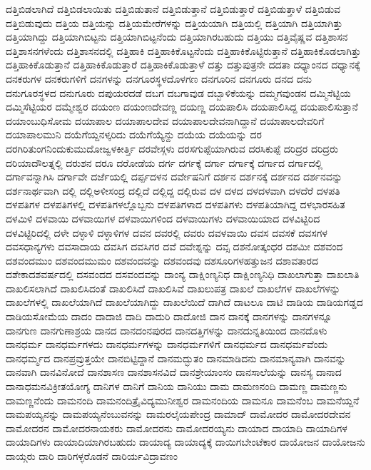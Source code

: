 {ದತ್ತಿಬಿಡಲಾಗಿದೆ
ದತ್ತಿಬಿಡಲಾಯಿತು
ದತ್ತಿಬಿಡುತಾನೆ
ದತ್ತಿಬಿಡುತ್ತಾನೆ
ದತ್ತಿಬಿಡುತ್ತಾರೆ
ದತ್ತಿಬಿಡುತ್ತಾಳೆ
ದತ್ತಿಬಿಡುವ
ದತ್ತಿಬಿಡುವುದು
ದತ್ತಿಯ
ದತ್ತಿಯನ್ನು
ದತ್ತಿಯಮೇರೆಗಳನ್ನು
ದತ್ತಿಯಯಾಗಿ
ದತ್ತಿಯಲ್ಲಿ
ದತ್ತಿಯಾಗಿ
ದತ್ತಿಯಾಗಿತ್ತು
ದತ್ತಿಯಾಗಿದ್ದು
ದತ್ತಿಯಾಗಿಬಿಟ್ಟನು
ದತ್ತಿಯಾಗಿಬಿಟ್ಟನೆಂದು
ದತ್ತಿಯಾಗಿರಬಹುದು
ದತ್ತಿಯು
ದತ್ತಿವೈಷ್ಣವ
ದತ್ತಿಶಾಸನ
ದತ್ತಿಶಾಸನಗಳೆಂದು
ದತ್ತಿಶಾಸನದಲ್ಲಿ
ದತ್ತಿಹಾಕಿ
ದತ್ತಿಹಾಕಿಕೊಟ್ಟನೆಂದು
ದತ್ತಿಹಾಕಿಕೊಟ್ಟಿರುತ್ತಾನೆ
ದತ್ತಿಹಾಕಿಕೊಡಲಾಗಿತ್ತು
ದತ್ತಿಹಾಕಿಕೊಡುತ್ತಾನೆ
ದತ್ತಿಹಾಕಿಕೊಡುತ್ತಾರೆ
ದತ್ತಿಹಾಕಿಕೊಡುತ್ತಾಳೆ
ದತ್ತು
ದತ್ತುಪುತ್ರನೇ
ದದತಾ
ದಧ್ಯಾಂನದ
ದಧ್ಯಾನಕ್ಕೆ
ದನಕರುಗಳ
ದನಕರುಗಳಿಗೆ
ದನಗಳನ್ನು
ದನಗೂರಸ್ಥಳದೊಳಗಣ
ದನಗೂರಿನ
ದನಗೂರು
ದನದ
ದನು
ದನುಗೂರಸ್ಥಳದ
ದನುಗೂರು
ದಪುಯರದಡೆ
ದಬಗ
ದಬಗಾವುಡ
ದಬ್ಬಾಳಿಕೆಯನ್ನು
ದಮ್ಮಗವುಂಡನ
ದಮ್ಮಿಸೆಟ್ಟಿಯ
ದಮ್ಮಿಸೆಟ್ಟಿಯರ
ದಮ್ಮೇಶ್ವರ
ದಯಂಣ
ದಯಂಣದೇವಣ್ಣ
ದಯಣ್ಣ
ದಯಪಾಲಿಸಿ
ದಯಪಾಲಿಸಿದ್ದ
ದಯಪಾಲಿಸುತ್ತಾನೆ
ದಯಾಂಬುಧಿಸೋಮ
ದಯಾಪಾಲ
ದಯಾಪಾಲದೇವ
ದಯಾಪಾಲದೇವನಾಗಿದ್ದಾನೆ
ದಯಾಪಾಲದೇವರಿಗೆ
ದಯಾಪಾಲಮುನಿ
ದಯೆಗೆಯ್ದನಳ್ಕರಿದು
ದಯೆಗೆಯ್ಯೆನ್ದು
ದಯೆಯ
ದಯೆಯನ್ನು
ದರ
ದರಗಿರಿತುಂಗನಿಂದುಕುಮುದೋಜ್ವಳಕೀರ್ತ್ತಿ
ದರವೇಸ್ಗಳು
ದರಸಗುಪ್ಪೆಯಾಗಿರುವ
ದರಸಿಕುಪ್ಪೆ
ದರಿದ್ರರ
ದರಿದ್ರರು
ದರಿಯಾದೌಲತ್ನಲ್ಲಿ
ದರುಶನ
ದರೂ
ದರೋಡೆಯ
ದರ್ಗ
ದರ್ಗಕ್ಕೆ
ದರ್ಗಾ
ದರ್ಗಾಕ್ಕೆ
ದರ್ಗಾದ
ದರ್ಗಾದಲ್ಲಿ
ದರ್ಗಾವನ್ನಾಗಿಸಿ
ದರ್ಗಾವೇ
ದರ್ಜೆಯಲ್ಲಿ
ದರ್ಪ್ಪದಳನ
ದರ್ವೇಷನಿಗೆ
ದರ್ಶನ
ದರ್ಶನಕ್ಕೆ
ದರ್ಶನದ
ದರ್ಶನವನ್ನು
ದರ್ಶನಾರ್ಥವಾಗಿ
ದಲ್ಲಿ
ದಲ್ಲಿಅಳೀಸಂದ್ರ
ದಲ್ಲಿದೆ
ದಲ್ಲಿದ್ದ
ದಲ್ಲಿರುವ
ದಳ
ದಳದ
ದಳದಳವಾಗಿ
ದಳದೆರೆ
ದಳಪತಿ
ದಳಪತಿಗಳ
ದಳಪತಿಗಳಲ್ಲಿ
ದಳಪತಿಗಳಲ್ಲೊಬ್ಬನು
ದಳಪತಿಗಳಾದ
ದಳಪತಿಗಳು
ದಳಪತಿಯಾಗಿದ್ದ
ದಳಭಾರಸಹಿತ
ದಳಮಿಳಿ
ದಳವಾಯಿ
ದಳವಾಯಿಗಳ
ದಳವಾಯಿಗಳಿಂದ
ದಳವಾಯಿಗಳು
ದಳವಾಯಿಯಾದ
ದಳವಿಟ್ಟಿರಿದ
ದಳವಿಟ್ಟಿರಿದಲ್ಲಿ
ದಳೇ
ದಳ್ಳಾಳಿ
ದಳ್ಳಾಳಿಗಳ
ದವನ
ದವರಲ್ಲಿ
ದವರು
ದವಳವಾಯಿ
ದವಸ
ದವಸಕೆ
ದವಸಗಳ
ದವಸಧಾನ್ಯಗಳು
ದವಸಾದಾಯ
ದವಸಿಗ
ದವಸಿಗರ
ದವೆ
ದವೇಶ್ನನ್ನು
ದವ್ಸ
ದಶನೋತ್ಕಂಧರ
ದಶಮೀ
ದಶವಂದ
ದಶವಂದಮುಂ
ದಶವಂದಮುಮಂ
ದಶವಂದವನ್ನು
ದಶವಂದವು
ದಶಸೂರಿಗಳಹತ್ತುಜನ
ದಶಾವತಾರದ
ದಶೇಕಾದಶವರ್ಷದಲ್ಲಿ
ದಸವಂದದ
ದಸವಂದವನ್ನು
ದಾಂನ್ಯ
ದಾಕ್ಷಿಂಣ್ಯನಿಧ
ದಾಕ್ಷಿಂಣ್ಯನಿಧಿ
ದಾಖಲಾಗುತ್ತಾ
ದಾಖಲಾತಿ
ದಾಖಲಿಸಲಾಗಿದೆ
ದಾಖಲಿಸಿದಂತೆ
ದಾಖಲಿಸಿದೆ
ದಾಖಲಿಸಿವೆ
ದಾಖಲುಪತ್ರ
ದಾಖಲೆ
ದಾಖಲೆಗಳ
ದಾಖಲೆಗಳನ್ನು
ದಾಖಲೆಗಳಲ್ಲಿ
ದಾಖಲೆಯಾಗಿದೆ
ದಾಖಲೆಯಾಗಿದ್ದು
ದಾಖಲೆಯಿದೆ
ದಾಗಿದೆ
ದಾಟಲೂ
ದಾಟಿ
ದಾಡಿಯ
ದಾಡಿಯಗಡ್ಡದ
ದಾಡಿಯಸೋಮೆಯ
ದಾದಂ
ದಾದಾಜಿ
ದಾದಿ
ದಾದುರಿ
ದಾದೋಜಿ
ದಾನ
ದಾನಕ್ಕೆ
ದಾನಗಳನ್ನು
ದಾನಗಳನ್ನೂ
ದಾನಗುಣ
ದಾನಗುಣಾಶ್ರಯ
ದಾನದ
ದಾನದಂನಪುರದ
ದಾನದತ್ತಿಗಳನ್ನು
ದಾನದುನ್ನತಿಯಿಂದ
ದಾನದೊಳು
ದಾನಧರ್ಮ
ದಾನಧರ್ಮಗಳದು
ದಾನಧರ್ಮಗಳನ್ನು
ದಾನಧರ್ಮಗಳಿಗೆ
ದಾನಧರ್ಮದ
ದಾನಧರ್ಮವೆಂದು
ದಾನಧರ್ಮ್ಮದ
ದಾನಪ್ರವ್ರುತ್ತಯೇ
ದಾನಬಿಟ್ಟಿದ್ದಾನೆ
ದಾನಮದ್ಭುತಂ
ದಾನಮಾಡಿದನು
ದಾನಮಾನ್ಯವಾಗಿ
ದಾನವನ್ನು
ದಾನವಾಗಿ
ದಾನವಿನೋದೆ
ದಾನಶಾಸಣ
ದಾನಶಾಸನವಿದೆ
ದಾನಶ್ರೇಯಾಂಸಂ
ದಾನಸಾಲೆಯನ್ನು
ದಾನಸ್ಯ
ದಾನಾದ
ದಾನಾಧಮನವಿಕ್ರೀತಯೋಗ್ಯ
ದಾನಿಗಳ
ದಾನಿಗೆ
ದಾನಿಯ
ದಾನಿಯು
ದಾಮ
ದಾಮಣನಂದಿ
ದಾಮಣ್ಣ
ದಾಮಣ್ಣನು
ದಾಮಣ್ಣನೆಂದು
ದಾಮನಂದಿ
ದಾಮನಂದಿತ್ರೈವಿದ್ಯಮುನೀಶ್ವರ
ದಾಮನಂದಿಯ
ದಾಮನೂ
ದಾಮನೆಂಬ
ದಾಮನೆಯ್ದನೆ
ದಾಮಪಯ್ಯನನ್ನು
ದಾಮಪಯ್ಯನೆಂಬುವನನ್ನು
ದಾಮರಲೈಯಪೇಂದ್ರ
ದಾಮಾದ್
ದಾಮೋದರ
ದಾಮೋದರದೇವನ
ದಾಮೋದರನ
ದಾಮೋದರನಾಯಕರು
ದಾಮೋದರನು
ದಾಮೋದರಯ್ಯನು
ದಾಯಾದ
ದಾಯಾದಿ
ದಾಯಾದಿಗಳ
ದಾಯಾದಿಗಳು
ದಾಯಾದಿಯಾಗಿರಬಹುದು
ದಾಯಾದ್ಯ
ದಾಯಾದ್ಯಕ್ಕೆ
ದಾಯಿಗಬೇಂಟೆಕಾರ
ದಾಯೋಜನ
ದಾಯೋಜನು
ದಾಯ್ಗರು
ದಾರಿ
ದಾರಿಗಳ್ಳರೊಡನೆ
ದಾರಿರ್ಯವಿದ್ರಾವಣಂ
}
